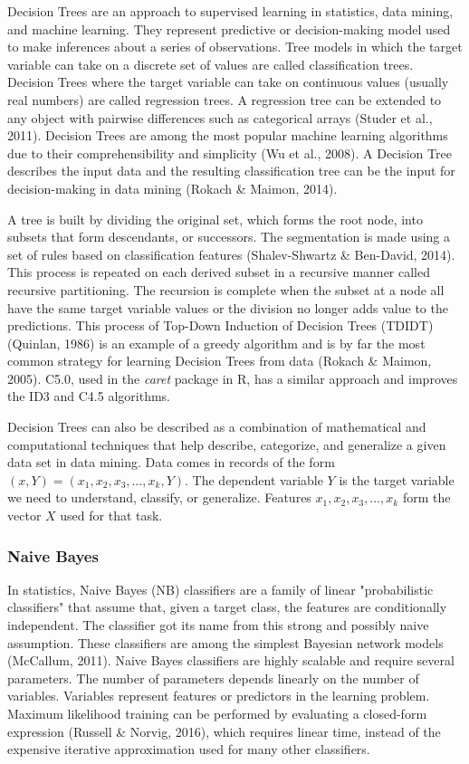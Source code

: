 \documentclass[sn-mathphys-num]{sn-jnl}%
\begin{document}
Decision Trees are an approach to supervised learning in statistics, data mining, and machine learning. They represent predictive or decision-making model used to make inferences about a series of observations. Tree models in which the target variable can take on a discrete set of values are called classification trees. Decision Trees where the target variable can take on continuous values (usually real numbers) are called regression trees. A regression tree can be extended to any object with pairwise differences such as categorical arrays (Studer et al., 2011). Decision Trees are among the most popular machine learning algorithms due to their comprehensibility and simplicity (Wu et al., 2008). A Decision Tree describes the input data and the resulting classification tree can be the input for decision-making in data mining (Rokach & Maimon, 2014).

A tree is built by dividing the original set, which forms the root node, into subsets that form descendants, or successors. The segmentation is made using a set of rules based on classification features (Shalev-Shwartz & Ben-David, 2014). This process is repeated on each derived subset in a recursive manner called recursive partitioning. The recursion is complete when the subset at a node all have the same target variable values or the division no longer adds value to the predictions. This process of Top-Down Induction of Decision Trees (TDIDT) (Quinlan, 1986) is an example of a greedy algorithm and is by far the most common strategy for learning Decision Trees from data (Rokach & Maimon, 2005). C5.0, used in the \textit{caret} package in R, has a similar approach and improves the ID3 and C4.5 algorithms.

Decision Trees can also be described as a combination of mathematical and computational techniques that help describe, categorize, and generalize a given data set in data mining. Data comes in records of the form $(x, Y) = (x_{1}, x_{2}, x_{3}, \ldots, x_{k}, Y)$. The dependent variable $Y$ is the target variable we need to understand, classify, or generalize. Features $x_{1}, x_{2}, x_{3}, \ldots, x_{k}$ form the vector $X$ used for that task.

\subsubsection{Naive Bayes}

In statistics, Naive Bayes (NB) classifiers are a family of linear "probabilistic classifiers" that assume that, given a target class, the features are conditionally independent. The classifier got its name from this strong and possibly naive assumption. These classifiers are among the simplest Bayesian network models (McCallum, 2011). Naive Bayes classifiers are highly scalable and require several parameters. The number of parameters depends linearly on the number of variables. Variables represent features or predictors in the learning problem. Maximum likelihood training can be performed by evaluating a closed-form expression (Russell & Norvig, 2016), which requires linear time, instead of the expensive iterative approximation used for many other classifiers.
\end{document}
